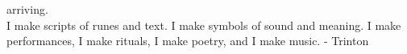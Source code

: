 \documentclass[11pt]{article}
\begin{document}
\begin{center}
arriving. \\ I make scripts of runes and text. I make symbols of sound and meaning. I make performances, I make rituals, I make poetry, and I make music.
\phantom{text} \hfill - Trinton
\end{center}
\endgroup
\end{document}
